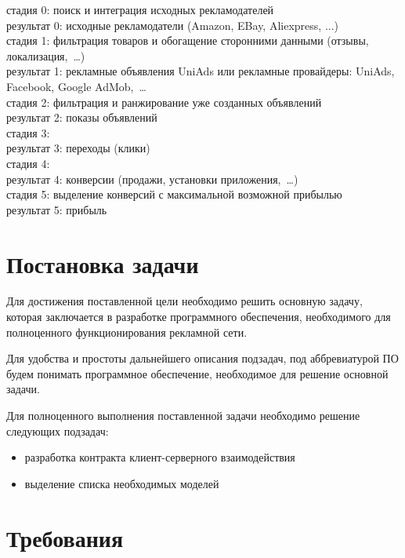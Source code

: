 \documentclass[times]{itmo-student-thesis}
\begin{document}
стадия 0: поиск и интеграция исходных рекламодателей
\\
результат 0: исходные рекламодатели (Amazon, EBay, Aliexpress, ...)
\\
стадия 1: фильтрация товаров и обогащение сторонними данными (отзывы, локализация, …)
\\
результат 1: рекламные объявления UniAds или рекламные провайдеры: UniAds, Facebook, Google AdMob, …
\\
стадия 2: фильтрация и ранжирование уже созданных объявлений
\\
результат 2: показы объявлений
\\
стадия 3:
\\
результат 3: переходы (клики)
\\
стадия 4:
\\
результат 4: конверсии (продажи, установки приложения, …)
\\
стадия 5: выделение конверсий с максимальной возможной прибылью
\\
результат 5: прибыль
\\	

\section{Постановка задачи}

Для достижения поставленной цели необходимо решить основную задачу, которая заключается в разработке программного обеспечения, необходимого для полноценного функционирования рекламной сети.

Для удобства и простоты дальнейшего описания подзадач, под аббревиатурой ПО будем понимать программное обеспечение, необходимое для решение основной задачи.

Для полноценного выполнения поставленной задачи необходимо решение следующих подзадач:
\begin{itemize}
\item разработка контракта клиент-серверного взаимодействия
\item выделение списка необходимых моделей 
\end{itemize}



\section{Требования}\label{sec:requirements}
\end{document}
